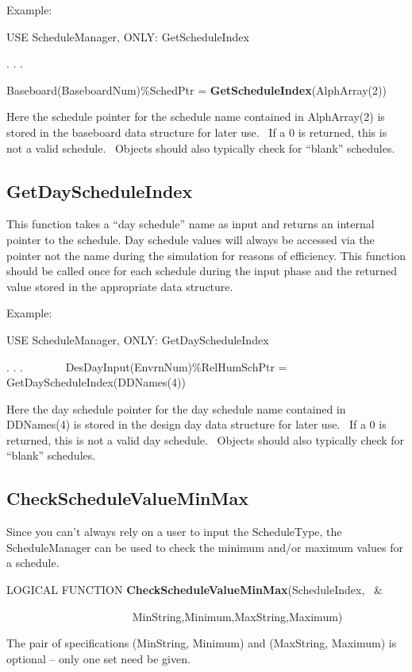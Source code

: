 Example:

USE ScheduleManager, ONLY: GetScheduleIndex

. . .

Baseboard(BaseboardNum)\%SchedPtr = \textbf{GetScheduleIndex}(AlphArray(2))

Here the schedule pointer for the schedule name contained in AlphArray(2) is stored in the baseboard data structure for later use.~ If a 0 is returned, this is not a valid schedule.~ Objects should also typically check for ``blank'' schedules.

\subsection{GetDayScheduleIndex}\label{getdayscheduleindex}

This function takes a ``day schedule'' name as input and returns an internal pointer to the schedule. Day schedule values will always be accessed via the pointer not the name during the simulation for reasons of efficiency. This function should be called once for each schedule during the input phase and the returned value stored in the appropriate data structure.

Example:

USE ScheduleManager, ONLY: GetDayScheduleIndex

. . .~~~~~~~ DesDayInput(EnvrnNum)\%RelHumSchPtr = GetDayScheduleIndex(DDNames(4))

Here the day schedule pointer for the day schedule name contained in DDNames(4) is stored in the design day data structure for later use.~ If a 0 is returned, this is not a valid day schedule.~ Objects should also typically check for ``blank'' schedules.

\subsection{CheckScheduleValueMinMax}\label{checkschedulevalueminmax}

Since you can't always rely on a user to input the ScheduleType, the ScheduleManager can be used to check the minimum and/or maximum values for a schedule.

LOGICAL FUNCTION \textbf{CheckScheduleValueMinMax}(ScheduleIndex,~ \&

~~~~~~~~~~~~~~~~~~~~~~ MinString,Minimum,MaxString,Maximum)

The pair of specifications (MinString, Minimum) and (MaxString, Maximum) is optional -- only one set need be given.

